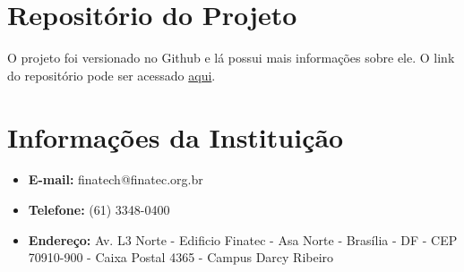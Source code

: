 \begin{anexosenv}

\partanexos

\chapter{Repositório do Projeto}
\label{appendix:anexo_certificado}

O projeto foi versionado no Github e lá possui mais informações sobre ele. O link do repositório pode
ser acessado \href{https://github.com/pbad-pades/pades-plugin}{aqui}.

\chapter{Informações da Instituição}

\begin{itemize}
\item \textbf{E-mail:} finatech@finatec.org.br
\item \textbf{Telefone:} (61) 3348-0400
\item \textbf{Endereço:} Av. L3 Norte - Edificio Finatec - Asa Norte - Brasília - DF - CEP 70910-900 - Caixa Postal 4365 - Campus Darcy Ribeiro
\end{itemize}

\end{anexosenv}
